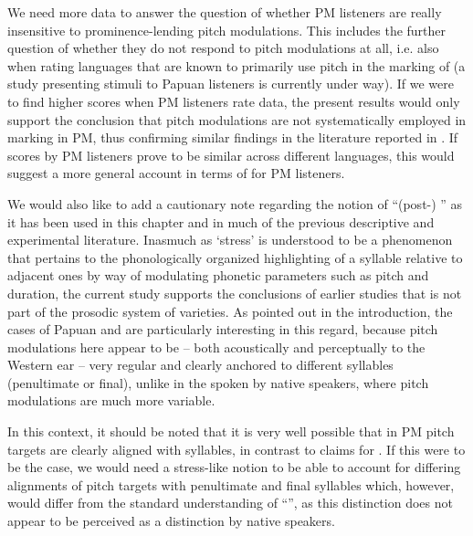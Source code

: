 \documentclass[output=paper
,modfonts
,nonflat]{langsci/langscibook}
\begin{document}
We need more data to answer the question of whether PM listeners are really insensitive to prominence-lending pitch modulations. This includes the further question of whether they do not respond to pitch modulations at all, i.e. also when rating languages that are known to primarily use pitch in the marking of  (a study presenting  stimuli to Papuan  listeners is currently under way). If we were to find higher  scores when PM listeners rate  data, the present results would only support the conclusion that pitch modulations are not systematically employed in  marking in PM, thus confirming similar findings in the literature reported in . If  scores by PM listeners prove to be similar across different languages, this would suggest a more general account in terms of  for PM listeners.

We would also like to add a cautionary note regarding the notion of “(post-) ” as it has been used in this chapter and in much of the previous descriptive and experimental literature. Inasmuch as ‘stress’ is understood to be a phenomenon that pertains to the phonologically organized highlighting of a syllable relative to adjacent ones by way of modulating phonetic parameters such as pitch and duration, the current study supports the conclusions of earlier studies that  is not part of the prosodic system of  varieties. As pointed out in the introduction, the cases of Papuan and   are particularly interesting in this regard, because pitch modulations here appear to be – both acoustically and perceptually to the Western ear – very regular and clearly anchored to different syllables (penultimate or final), unlike in the  spoken by  native speakers, where pitch modulations are much more variable. 

In this context, it should be noted that it is very well possible that in PM pitch targets are clearly aligned with syllables, in contrast to  claims for  . If this were to be the case, we would need a stress-like notion to be able to account for differing alignments of pitch targets with penultimate and final syllables which, however, would differ from the standard understanding of “”, as this distinction does not appear to be perceived as a  distinction by native speakers.
\end{document}
